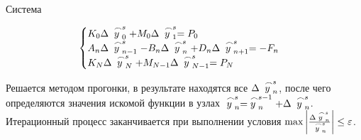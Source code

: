     Система

    \begin{equation*}
        \begin{cases}
            K_0 \Delta \LittleCap{y}_0^s + M_0 \Delta \LittleCap{y}_1^s = P_0 \\
            A_n \Delta \LittleCap{y}_{n-1}^s - B_n \Delta\LittleCap{y}_n^s + D_n \Delta \LittleCap{y}_{n+1}^s = -F_n \\
            K_N \Delta \LittleCap{y}_N^s + M_{N-1} \Delta \LittleCap{y}_{N-1}^s = P_N \\
        \end{cases}
    \end{equation*}

    Решается методом прогонки, в результате находятся все $\Delta \LittleCap{y}_n^s$, после чего определяются значения искомой функции в узлах $\LittleCap{y}_n^s = \LittleCap{y}_n^{s-1} + \Delta \LittleCap{y}_n^s$. Итерационный процесс заканчивается при выполнении условия $\max \bigg| \frac{\Delta \LittleCap{y}_n^s}{\LittleCap{y}_n^s} \bigg| \le \varepsilon$.

